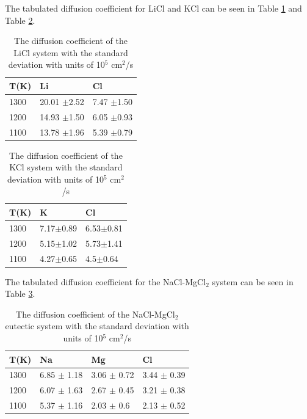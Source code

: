 \documentclass[review]{elsarticle}
\begin{document}
The tabulated diffusion coefficient for LiCl and KCl can be seen in Table \ref{Table: licl diffusion} and Table \ref{Table: kcl diffusion}.

\begin{table}[h]
\centering
\caption{The diffusion coefficient of the LiCl system with the standard deviation with units of 10$^5$ cm$^2$/s }
\begin{tabular}{lll}
\hline
T(K) & Li           & Cl        \\
\hline
1300 & 20.01 $\pm$2.52 & 7.47 $\pm$1.50  \\
1200 & 14.93 $\pm$1.50  & 6.05 $\pm$0.93 \\
1100 & 13.78 $\pm$1.96& 5.39 $\pm$0.79 \\
\hline
\end{tabular}
\label{Table: licl diffusion}
\end{table}


\begin{table}[h]
\centering
\caption{The diffusion coefficient of the KCl system with the standard deviation with units of 10$^5$ cm$^2$/s }
\begin{tabular}{lll}
\hline
T(K) & K         & Cl        \\
\hline
1300 & 7.17$\pm$0.89 & 6.53$\pm$0.81 \\
1200 & 5.15$\pm$1.02 & 5.73$\pm$1.41 \\
1100 & 4.27$\pm$0.65 & 4.5$\pm$0.64 \\
\hline
\end{tabular}
\label{Table: kcl diffusion}
\end{table}
\FloatBarrier

The tabulated diffusion coefficient for the NaCl-MgCl$_2$ system can be seen in Table \ref{Table: nacl-mgcl2_eut diffusion}.

\begin{table}[h]
\centering
\caption{The diffusion coefficient of the NaCl-MgCl$_2$ eutectic system with the standard deviation with units of 10$^5$ cm$^2$/s }
\begin{tabular}{llll}
\hline
T(K) & Na          & Mg          & Cl          \\
\hline
1300 & 6.85 $\pm$ 1.18 & 3.06 $\pm$ 0.72 & 3.44 $\pm$ 0.39 \\
1200 & 6.07 $\pm$ 1.63 & 2.67 $\pm$ 0.45 & 3.21 $\pm$ 0.38 \\
1100 & 5.37 $\pm$ 1.16 & 2.03 $\pm$ 0.6  & 2.13 $\pm$ 0.52 \\
\hline
\end{tabular}
\label{Table: nacl-mgcl2_eut diffusion}
\end{table}
\FloatBarrier
\end{document}
